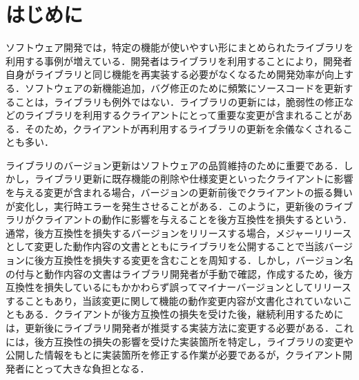\documentclass[11pt]{jreport}
\begin{document}

\newpage
{}	%



\chapter{はじめに}
ソフトウェア開発では，特定の機能が使いやすい形にまとめられたライブラリを利用する事例が増えている\cite{UnderstandingWild}．開発者はライブラリを利用することにより，開発者自身がライブラリと同じ機能を再実装する必要がなくなるため開発効率が向上する\cite{konstantopoulos2009best}\cite{Moser1996effect}．ソフトウェアの新機能追加，バグ修正のために頻繁にソースコードを更新することは，ライブラリも例外ではない\cite{raemaekers2012measuring}．ライブラリの更新には，脆弱性の修正などのライブラリを利用するクライアントにとって重要な変更が含まれることがある．そのため，クライアントが再利用するライブラリの更新を余儀なくされることも多い．

ライブラリのバージョン更新はソフトウェアの品質維持のために重要である．しかし，ライブラリ更新に既存機能の削除や仕様変更といったクライアントに影響を与える変更が含まれる場合，バージョンの更新前後でクライアントの振る舞いが変化し，実行時エラーを発生させることがある．このように，更新後のライブラリがクライアントの動作に影響を与えることを後方互換性を損失するという．通常，後方互換性を損失するバージョンをリリースする場合，メジャーリリースとして変更した動作内容の文書とともにライブラリを公開することで当該バージョンに後方互換性を損失する変更を含むことを周知する．しかし，バージョン名の付与と動作内容の文書はライブラリ開発者が手動で確認，作成するため，後方互換性を損失しているにもかかわらず誤ってマイナーバージョンとしてリリースすることもあり，当該変更に関して機能の動作変更内容が文書化されていないこともある\cite{UnderstandingWild}\cite{mostafa2017experience}．クライアントが後方互換性の損失を受けた後，継続利用するためには，更新後にライブラリ開発者が推奨する実装方法に変更する必要がある．これには，後方互換性の損失の影響を受けた実装箇所を特定し，ライブラリの変更や公開した情報をもとに実装箇所を修正する作業が必要であるが，クライアント開発者にとって大きな負担となる\cite{Nielsen2021JSFix}\cite{10.1145/3428255}．
\end{document}

